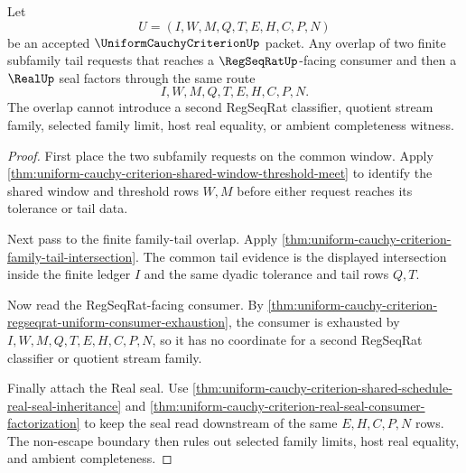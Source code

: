 \begin{theorem}
\label{thm:uniform-cauchy-criterion-regseqrat-real-seal-overlap}
Let
$$
U=(I,W,M,Q,T,E,H,C,P,N)
$$
be an accepted $\UniformCauchyCriterionUp$ packet. Any overlap of two finite subfamily tail requests that reaches a $\RegSeqRatUp$-facing consumer and then a $\RealUp$ seal factors through the same route
$$
I,W,M,Q,T,E,H,C,P,N.
$$
The overlap cannot introduce a second RegSeqRat classifier, quotient stream family, selected family limit, host real equality, or ambient completeness witness.
\end{theorem}
\begin{proof}
First place the two subfamily requests on the common window. Apply \autoref{thm:uniform-cauchy-criterion-shared-window-threshold-meet} to identify the shared window and threshold rows $W,M$ before either request reaches its tolerance or tail data.

Next pass to the finite family-tail overlap. Apply \autoref{thm:uniform-cauchy-criterion-family-tail-intersection}. The common tail evidence is the displayed intersection inside the finite ledger $I$ and the same dyadic tolerance and tail rows $Q,T$.

Now read the RegSeqRat-facing consumer. By \autoref{thm:uniform-cauchy-criterion-regseqrat-uniform-consumer-exhaustion}, the consumer is exhausted by $I,W,M,Q,T,E,H,C,P,N$, so it has no coordinate for a second RegSeqRat classifier or quotient stream family.

Finally attach the Real seal. Use \autoref{thm:uniform-cauchy-criterion-shared-schedule-real-seal-inheritance} and \autoref{thm:uniform-cauchy-criterion-real-seal-consumer-factorization} to keep the seal read downstream of the same $E,H,C,P,N$ rows. The non-escape boundary then rules out selected family limits, host real equality, and ambient completeness.
\end{proof}

